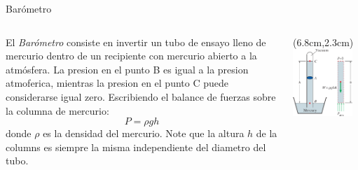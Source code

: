 \documentclass [xcolor=svgnames, t] {beamer}
\begin{document}
\begin{frame}{Bar\'ometro}
\begin{columns}
\vspace{-1cm}
\begin{block}{}
El \emph{Bar\'ometro} consiste en invertir un tubo de ensayo lleno de mercurio dentro de un recipiente con mercurio abierto a la atm\'osfera.  La presion en el punto B es igual a la presion atmoferica, mientras la presion en el punto C puede considerarse igual zero. Escribiendo el balance de fuerzas sobre la columna de mercurio:
$$
P = \rho g h
$$
donde $\rho$ es la densidad del mercurio. Note que la altura $h$ de la columns es siempre la misma independiente del diametro del tubo. 
\end{block}
\begin{textblock*}{6.5cm}(6.8cm,2.3cm) %
\includegraphics[width=0.9\textwidth]{baro1}
\end{textblock*}
\end{columns}
\end{frame}
\end{document}
